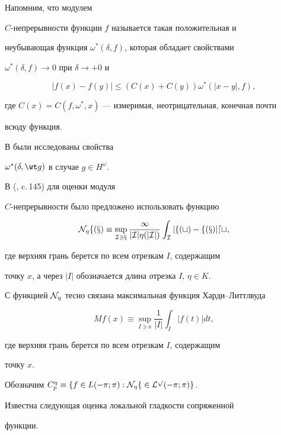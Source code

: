 Напомним, что модулем


$C$-непрерывности функции $f$ называется такая положительная и


неубывающая функция $\omega^*(\delta,f)$, которая обладает свойствами


$\omega^*(\delta,f)\to 0$ при $\delta\to+0$ и


$$


|f(x)-f(y)|\le (C(x)+C(y))\omega^*(|x-y|,f),


$$


где $C(x)=C(f,\omega^*,x)$ --- измеримая, неотрицательная, конечная почти


всюду функция.


В \cite{osk} были исследованы свойства


$\omega^*(\delta,\wt g)$ в случае $g\in H^\omega$.


В (\cite{kol}, c.\,145) для оценки модуля


$C$-непрерывности было предложено использовать функцию


$$


\N_\eta f(x)\equiv\sup_{I\ni x}\frac{1}{|I|\eta(|I|)}\int_I|f(t)-f(x)|dt,


$$


где верхняя грань берется по всем отрезкам $I$, содержащим


точку $x$, а через $|I|$ обозначается длина отрезка $I$, $\eta\in K$.


С функцией $\cal N_\eta$ тесно связана максимальная функция Харди--Литтлвуда


$$


Mf(x)\equiv\sup_{I\ni x}\frac{1}{|I|}\int_I|f(t)|dt,


$$


где верхняя грань берется по всем отрезкам $I$, содержащим


точку $x$.





Обозначим $C^\eta_p\equiv\{f\in L(-\pi;\pi):\cal N_\eta f\in L^p(-\pi;\pi)\}$.


Известна следующая оценка локальной гладкости сопряженной


функции. 


\medskip





